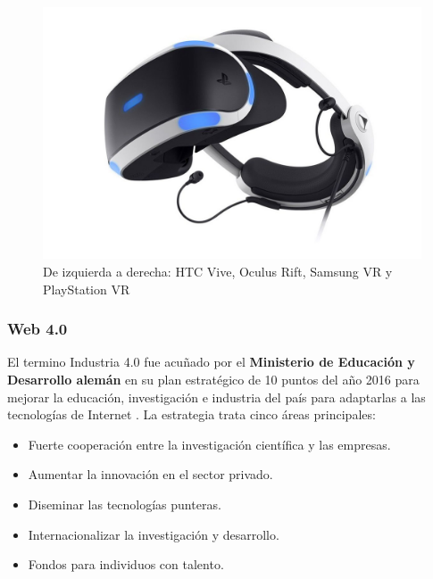 \begin{figure}[!htb]
\begin {minipage}{0.24\textwidth}
   \end{minipage}
      \begin {minipage}{0.24\textwidth}
     \centering
     \includegraphics[width=0.7\linewidth, left]{images/estadodelarte/mercado/foto-sony-vr}
   \end{minipage}
   \caption{De izquierda a derecha: HTC Vive, Oculus Rift, Samsung VR y PlayStation VR}
	\label{fotos_vr}
\end{figure}

\subsubsection{Web 4.0}
El termino Industria 4.0 fue acuñado por el \textbf{Ministerio de Educación y Desarrollo alemán} en su plan estratégico de 10 puntos del año 2016 para mejorar la educación, investigación e industria del país para adaptarlas a las tecnologías de Internet \cite{web_4_0}. La estrategia trata cinco áreas principales:
\begin{itemize}
\item Fuerte cooperación entre la investigación científica y las empresas.
\item Aumentar la innovación en el sector privado.
\item Diseminar las tecnologías punteras.
\item Internacionalizar la investigación y desarrollo.
\item Fondos para individuos con talento.
\end{itemize}

